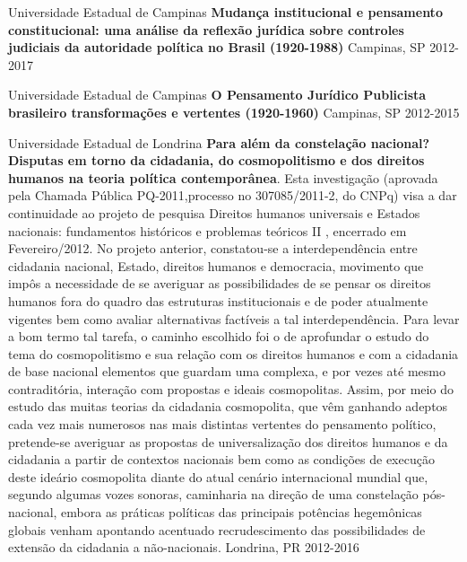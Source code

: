 \begin{cvhonors}
  \cvhonor
    {Universidade Estadual de Campinas}
    {\textbf{Mudança institucional e pensamento constitucional: uma análise da reflexão jurídica sobre controles judiciais da autoridade política no Brasil (1920-1988)}}
    {Campinas, SP}
    {2012-2017}
\end{cvhonors}
\begin{cvhonors}
  \cvhonor
    {Universidade Estadual de Campinas}
    {\textbf{O Pensamento Jurídico Publicista brasileiro transformações e vertentes (1920-1960)}}
    {Campinas, SP}
    {2012-2015}
\end{cvhonors}
\begin{cvhonors}
  \cvhonor
    {Universidade Estadual de Londrina}
    {\textbf{Para além da constelação nacional? Disputas em torno da cidadania, do cosmopolitismo e dos direitos humanos na teoria política contemporânea}. Esta investigação (aprovada pela Chamada Pública PQ-2011,processo no 307085/2011-2, do CNPq) visa a dar continuidade ao projeto de pesquisa Direitos humanos universais e Estados nacionais: fundamentos históricos e problemas teóricos II , encerrado em Fevereiro/2012. No projeto anterior, constatou-se a interdependência entre cidadania nacional, Estado, direitos humanos e democracia, movimento que impôs a necessidade de se averiguar as possibilidades de se pensar os direitos humanos fora do quadro das estruturas institucionais e de poder atualmente vigentes bem como avaliar alternativas factíveis a tal interdependência. Para levar a bom termo tal tarefa, o caminho escolhido foi o de aprofundar o estudo do tema do cosmopolitismo e sua relação com os direitos humanos e com a cidadania de base nacional elementos que guardam uma complexa, e por vezes até mesmo contraditória, interação com propostas e ideais cosmopolitas. Assim, por meio do estudo das muitas teorias da cidadania cosmopolita, que vêm ganhando adeptos cada vez mais numerosos nas mais distintas vertentes do pensamento político, pretende-se averiguar as propostas de universalização dos direitos humanos e da cidadania a partir de contextos nacionais bem como as condições de execução deste ideário cosmopolita diante do atual cenário internacional mundial que, segundo algumas vozes sonoras, caminharia na direção de uma constelação pós-nacional, embora as práticas políticas das principais potências hegemônicas globais venham apontando acentuado recrudescimento das possibilidades de extensão da cidadania a não-nacionais.}
    {Londrina, PR}
    {2012-2016}
\end{cvhonors}
